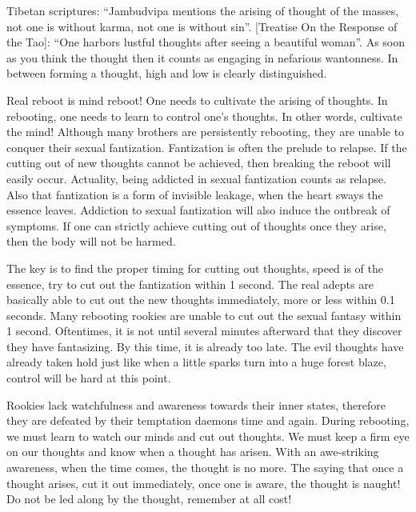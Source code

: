 \documentclass[
]{book}
\begin{document}
Tibetan scriptures: ``Jambudvipa mentions the arising of thought of the masses, not one is without karma, not one is without sin''. {[}Treatise On the Response of the Tao{]}: ``One harbors lustful thoughts after seeing a beautiful woman''. As soon as you think the thought then it counts as engaging in nefarious wantonness. In between forming a thought, high and low is clearly distinguished.

Real reboot is mind reboot! One needs to cultivate the arising of thoughts. In rebooting, one needs to learn to control one's thoughts. In other words, cultivate the mind! Although many brothers are persistently rebooting, they are unable to conquer their sexual fantization. Fantization is often the prelude to relapse. If the cutting out of new thoughts cannot be achieved, then breaking the reboot will easily occur. Actuality, being addicted in sexual fantization counts as relapse. Also that fantization is a form of invisible leakage, when the heart sways the essence leaves. Addiction to sexual fantization will also induce the outbreak of symptoms. If one can strictly achieve cutting out of thoughts once they arise, then the body will not be harmed.

The key is to find the proper timing for cutting out thoughts, speed is of the essence, try to cut out the fantization within 1 second. The real adepts are basically able to cut out the new thoughts immediately, more or less within 0.1 seconds. Many rebooting rookies are unable to cut out the sexual fantasy within 1 second. Oftentimes, it is not until several minutes afterward that they discover they have fantasizing. By this time, it is already too late. The evil thoughts have already taken hold just like when a little sparks turn into a huge forest blaze, control will be hard at this point.

Rookies lack watchfulness and awareness towards their inner states, therefore they are defeated by their temptation daemons time and again. During rebooting, we must learn to watch our minds and cut out thoughts. We must keep a firm eye on our thoughts and know when a thought has arisen. With an awe-striking awareness, when the time comes, the thought is no more. The saying that once a thought arises, cut it out immediately, once one is aware, the thought is naught! Do not be led along by the thought, remember at all cost!
\end{document}
